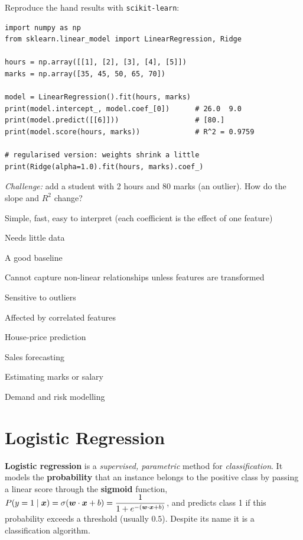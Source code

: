 \begin{tryit}
Reproduce the hand results with \texttt{scikit-learn}:
\begin{lstlisting}
import numpy as np
from sklearn.linear_model import LinearRegression, Ridge

hours = np.array([[1], [2], [3], [4], [5]])
marks = np.array([35, 45, 50, 65, 70])

model = LinearRegression().fit(hours, marks)
print(model.intercept_, model.coef_[0])      # 26.0  9.0
print(model.predict([[6]]))                  # [80.]
print(model.score(hours, marks))             # R^2 = 0.9759

# regularised version: weights shrink a little
print(Ridge(alpha=1.0).fit(hours, marks).coef_)
\end{lstlisting}
\emph{Challenge:} add a student with 2 hours and 80 marks (an outlier). How do the slope and $R^2$ change?
\end{tryit}

{\item Simple, fast, easy to interpret (each coefficient is the effect of one feature)
 \item Needs little data
 \item A good baseline}
{\item Cannot capture non-linear relationships unless features are transformed
 \item Sensitive to outliers
 \item Affected by correlated features}
{\item House-price prediction
 \item Sales forecasting
 \item Estimating marks or salary
 \item Demand and risk modelling}

\section{Logistic Regression}


\begin{definition}
\textbf{Logistic regression} is a \emph{supervised, parametric} method for \emph{classification}. It models the \textbf{probability} that an instance belongs to the positive class by passing a linear score through the \textbf{sigmoid} function, $P(y=1\mid\boldsymbol{x})=\sigma(\boldsymbol{w}\cdot\boldsymbol{x}+b)=\dfrac{1}{1+e^{-(\boldsymbol{w}\cdot\boldsymbol{x}+b)}}$, and predicts class 1 if this probability exceeds a threshold (usually $0.5$). Despite its name it is a classification algorithm.
\end{definition}



